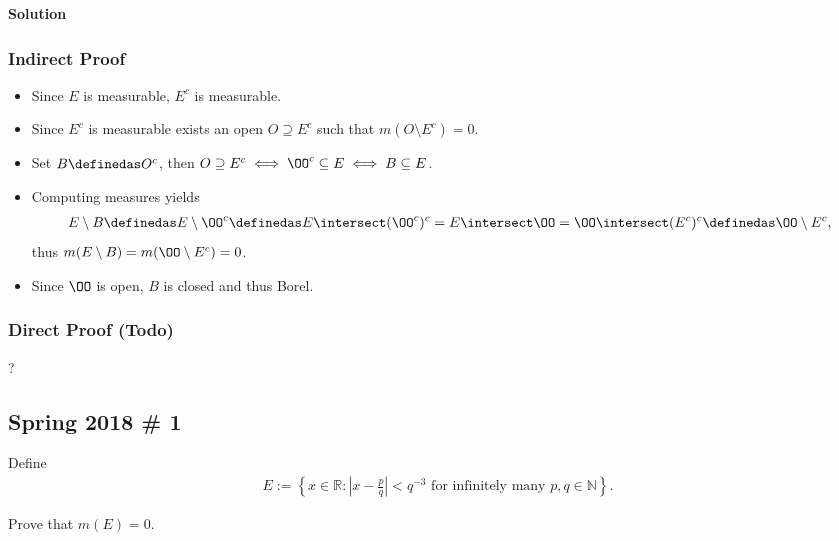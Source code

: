 \begin{solution}
\textbf{Solution}

\hypertarget{indirect-proof}{%
\subsubsection{Indirect Proof}\label{indirect-proof}}

\begin{itemize}
\tightlist
\item
  Since \(E\) is measurable, \(E^c\) is measurable.
\item
  Since \(E^c\) is measurable exists an open \(O\supseteq E^c\) such
  that \(m(O\setminus E^c) = 0\).
\item
  Set \(B \definedas O^c\), then
  \(O\supseteq E^c \iff \OO^c \subseteq E \iff B\subseteq E\).
\item
  Computing measures yields
  \begin{align*}
  E\setminus B \definedas E\setminus  \OO^c \definedas E\intersect (\OO^c)^c = E\intersect \OO = \OO \intersect(E^c)^c \definedas \OO \setminus E^c
  ,\end{align*} thus \(m(E\setminus B) = m(\OO\setminus E^c) = 0\).
\item
  Since \(\OO\) is open, \(B\) is closed and thus Borel.
\end{itemize}

\hypertarget{direct-proof-todo}{%
\subsubsection{Direct Proof (Todo)}\label{direct-proof-todo}}

? 

\end{solution}

\hypertarget{spring-2018-1}{%
\subsection{Spring 2018 \# 1}\label{spring-2018-1}}

Define
\begin{align*}
E:=\left\{x \in \mathbb{R}:\left|x-\frac{p}{q}\right|<q^{-3} \text { for infinitely many } p, q \in \mathbb{N}\right\}.
\end{align*}

Prove that \(m(E) = 0\).

